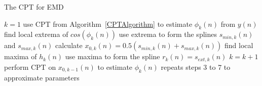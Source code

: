 \documentclass[a4paper]{IEEEtran}
\begin{document}
\begin{algorithm}
\caption{The CPT for EMD}\label{CPTEMDAlgorithm}
\begin{algorithmic}[1]
\State $k=1$
\State use CPT from Algorithm~\ref{CPTAlgorithm} to estimate $\phi_k(n)$ from $y(n)$
\State find local extrema of $cos\left(\phi_k(n)\right)$
\State use extrema to form the splines $s_{min,k}(n)$ and $s_{max,k}(n)$
\State calculate $x_{0,k}(n) = 0.5\left(s_{min,k}(n) + s_{max,k}(n)\right)$
\State find local maxima of $h_k(n)$
\State use maxima to form the spline $r_k(n) = s_{ext,k}(n)$
    \State $k=k+1$
    \State perform CPT on $x_{0,k-1}(n)$ to estimate $\phi_{k}(n)$
    \State repeats steps 3 to 7 to approximate parameters
\EndWhile

\end{algorithmic}
\end{algorithm}

\end{document}

